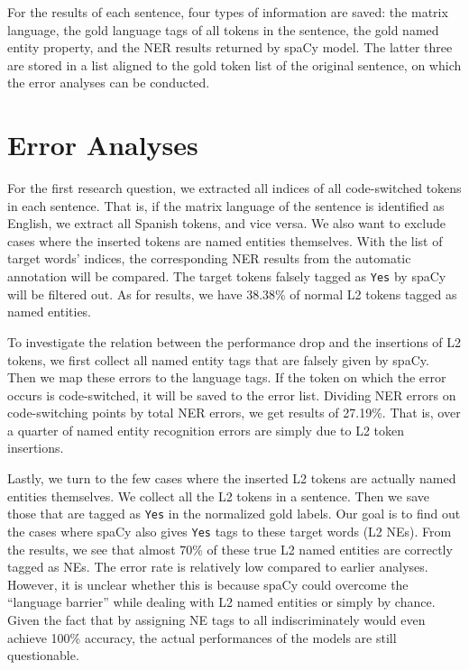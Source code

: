 \documentclass[11pt]{article}
\begin{document}
For the results of each sentence, four types of information are saved: the matrix language, the gold language tags of all tokens in the sentence, the gold named entity property, and the NER results returned by spaCy model. The latter three are stored in a list aligned to the gold token list of the original sentence, on which the error analyses can be conducted.


\section{Error Analyses}

For the first research question, we extracted all indices of all code-switched tokens in each sentence. That is, if the matrix language of the sentence is identified as English, we extract all Spanish tokens, and vice versa. We also want to exclude cases where the inserted tokens are named entities themselves. With the list of target words' indices, the corresponding NER results from the automatic annotation will be compared. The target tokens falsely tagged as \texttt{Yes} by spaCy will be filtered out. As for results, we have 38.38\% of normal L2 tokens tagged as named entities.

To investigate the relation between the performance drop and the insertions of L2 tokens, we first collect all named entity tags that are falsely given by spaCy. Then we map these errors to the language tags. If the token on which the error occurs is code-switched, it will be saved to the error list. Dividing NER errors on code-switching points by total NER errors, we get results of 27.19\%. That is, over a quarter of named entity recognition errors are simply due to L2 token insertions.

Lastly, we turn to the few cases where the inserted L2 tokens are actually named entities themselves. We collect all the L2 tokens in a sentence. Then we save those that are tagged as \texttt{Yes} in the normalized gold labels. Our goal is to find out the cases where spaCy also gives \texttt{Yes} tags to these target words (L2 NEs). From the results, we see that almost 70\% of these true L2 named entities are correctly tagged as NEs. The error rate is relatively low compared to earlier analyses. However, it is unclear whether this is because spaCy could overcome the ``language barrier'' while dealing with L2 named entities or simply by chance. Given the fact that by assigning NE tags to all indiscriminately would even achieve 100\% accuracy, the actual performances of the models are still questionable.
\end{document}
